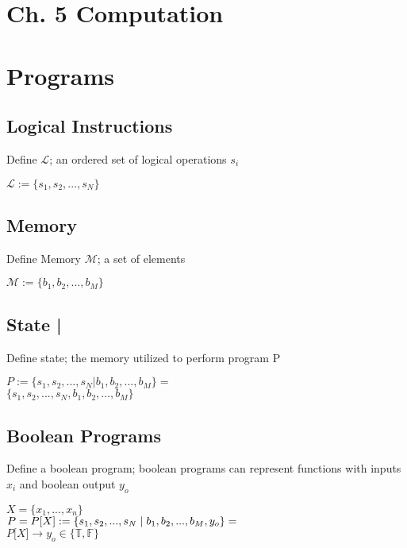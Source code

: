 \documentclass[11pt]{article}
\begin{document}
\section*{Ch. 5 Computation}





\section{Programs}
\subsection{Logical Instructions}
Define $\mathcal{L}$; an ordered set of logical operations $s_i$
\begin{center}
$
\mathcal{L} := \{ s_1,s_2,...,s_{N}\}
$
\end{center}





\subsection{Memory}
Define Memory $\mathcal{M}$; a set of elements
\begin{center}
$\mathcal{M} := \{b_1,b_2,...,b_M\}$
\end{center}




\subsection{State |}
Define state; the memory utilized to perform program P
\begin{center}
$
P := \{ s_1, s_2,...,s_{N} | b_1, b_2,...,b_M\} =
$
\\ \vspace{2mm}
$
\{ s_1, s_2,...,s_{N}, b_1, b_2,...,b_M\}
$
\end{center}





\subsection{Boolean Programs}
Define a boolean program; boolean programs can represent functions with inputs $x_i$ and boolean output $y_o$
\begin{center}
$
X = \{x_1,...,x_n\}
$
\\ \vspace{2mm}
$P = P\lbrack X \rbrack := \{ s_1,s_2,...,s_{N}\hspace{1mm}|\hspace{1mm} b_1, b_2,...,b_M,y_o\}=$
\\ \vspace{2mm}
$
P\lbrack X \rbrack \rightarrow y_o \in \{ \mathbb{T},\mathbb{F}\}
$
\end{center}
\end{document}
